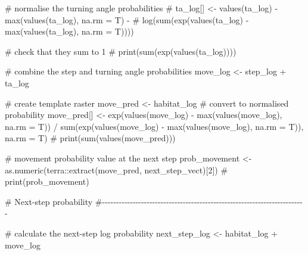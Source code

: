 \documentclass[
  letterpaper,
  DIV=11,
  numbers=noendperiod]{scrartcl}
\newenvironment{Shaded}{\begin{snugshade}}{\end{snugshade}}
\newcommand{\AttributeTok}[1]{\textcolor[rgb]{0.40,0.45,0.13}{#1}}
\newcommand{\CommentTok}[1]{\textcolor[rgb]{0.37,0.37,0.37}{#1}}
\newcommand{\DecValTok}[1]{\textcolor[rgb]{0.68,0.00,0.00}{#1}}
\newcommand{\FunctionTok}[1]{\textcolor[rgb]{0.28,0.35,0.67}{#1}}
\newcommand{\NormalTok}[1]{\textcolor[rgb]{0.00,0.23,0.31}{#1}}
\newcommand{\OtherTok}[1]{\textcolor[rgb]{0.00,0.23,0.31}{#1}}
\newcommand{\SpecialCharTok}[1]{\textcolor[rgb]{0.37,0.37,0.37}{#1}}
\begin{document}
\begin{Shaded}
\begin{Highlighting}[]
      \CommentTok{\# normalise the turning angle probabilities}
      \CommentTok{\# ta\_log[] \textless{}{-} values(ta\_log) {-} max(values(ta\_log), na.rm = T) {-} }
      \CommentTok{\#   log(sum(exp(values(ta\_log) {-} max(values(ta\_log), na.rm = T))))}
      
      \CommentTok{\# check that they sum to 1}
      \CommentTok{\# print(sum(exp(values(ta\_log))))}
      
      \CommentTok{\# combine the step and turning angle probabilities}
\NormalTok{      move\_log }\OtherTok{\textless{}{-}}\NormalTok{ step\_log }\SpecialCharTok{+}\NormalTok{ ta\_log}
      
      \CommentTok{\# create template raster}
\NormalTok{      move\_pred }\OtherTok{\textless{}{-}}\NormalTok{ habitat\_log}
      \CommentTok{\# convert to normalised probability}
\NormalTok{      move\_pred[] }\OtherTok{\textless{}{-}} \FunctionTok{exp}\NormalTok{(}\FunctionTok{values}\NormalTok{(move\_log) }\SpecialCharTok{{-}} \FunctionTok{max}\NormalTok{(}\FunctionTok{values}\NormalTok{(move\_log), }\AttributeTok{na.rm =}\NormalTok{ T)) }\SpecialCharTok{/} 
        \FunctionTok{sum}\NormalTok{(}\FunctionTok{exp}\NormalTok{(}\FunctionTok{values}\NormalTok{(move\_log) }\SpecialCharTok{{-}} \FunctionTok{max}\NormalTok{(}\FunctionTok{values}\NormalTok{(move\_log), }\AttributeTok{na.rm =}\NormalTok{ T)), }\AttributeTok{na.rm =}\NormalTok{ T)}
      \CommentTok{\# print(sum(values(move\_pred)))}
      
      \CommentTok{\# movement probability value at the next step}
\NormalTok{      prob\_movement }\OtherTok{\textless{}{-}} \FunctionTok{as.numeric}\NormalTok{(terra}\SpecialCharTok{::}\FunctionTok{extract}\NormalTok{(move\_pred, next\_step\_vect)[}\DecValTok{2}\NormalTok{])}
      \CommentTok{\# print(prob\_movement)}
      
      
      \CommentTok{\# Next{-}step probability}
      \CommentTok{\#{-}{-}{-}{-}{-}{-}{-}{-}{-}{-}{-}{-}{-}{-}{-}{-}{-}{-}{-}{-}{-}{-}{-}{-}{-}{-}{-}{-}{-}{-}{-}{-}{-}{-}{-}{-}{-}{-}{-}{-}{-}{-}{-}{-}{-}{-}{-}{-}{-}{-}{-}{-}{-}{-}{-}{-}{-}{-}{-}{-}{-}{-}{-}{-}{-}{-}{-}{-}{-}{-}{-}{-}{-}}
      
      \CommentTok{\# calculate the next{-}step log probability}
\NormalTok{      next\_step\_log }\OtherTok{\textless{}{-}}\NormalTok{ habitat\_log }\SpecialCharTok{+}\NormalTok{ move\_log}
      

\end{Highlighting}
\end{Shaded}
\end{document}
